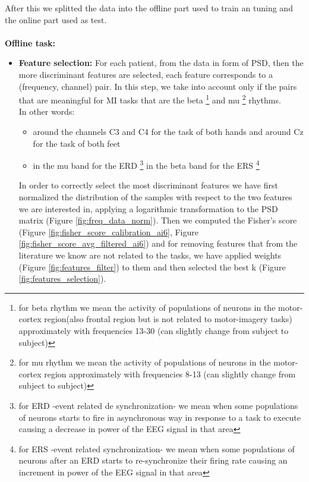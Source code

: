 After this we splitted the data into the offline part used to train an tuning and the online part used as test.\\ \\
{\Large \textbf{Offline task:}}
\begin{itemize}
\item \textbf{Feature selection:}  For each patient, from the data in form of PSD, then the more discriminant features are selected, each feature corresponds to a (frequency, channel) pair. In this step, we take into account only if the pairs that are meaningful for MI tasks that are the beta
\footnote{for beta rhythm we mean the activity of populations of neurons in the motor-cortex region(also frontal region but is not related to motor-imagery tasks) approximately with frequencies 13-30 (can slightly change from subject to subject)}
 and mu
 \footnote{for mu rhythm we mean the activity of populations of neurons in the motor-cortex region approximately with frequencies 8-13 (can slightly change from subject to subject)}
rhythms.\\
In other words:
\begin{itemize}
\item around the channels C3 and C4 for the task of both hands and around Cz for the task of both feet
\item  in the mu band for the ERD
 \footnote{for ERD -event related de synchronization- we mean when some populations of neurons starts to fire in asynchronous way in response to a task to execute causing a decrease in power of the EEG signal in that area}
 in the beta band for the ERS 
 \footnote{for ERS -event related synchronization- we mean when some populations of neurons after an ERD starts to re-synchronize their firing rate causing an increment in power of the EEG signal in that area}
\end{itemize}
In order to correctly select the most discriminant features we have first normalized the distribution of the samples with respect to the two features we are interested in, applying a logarithmic transformation to the PSD matrix (Figure \ref{fig:freq_data_norm}).
Then we computed the Fisher's score (Figure \ref{fig:fisher_score_calibration_ai6}, Figure \ref{fig:fisher_score_avg_filtered_ai6}) and for removing features that from the literature we know are not related to the tasks, we have applied weights (Figure \ref{fig:features_filter}) to them and then selected the best k (Figure \ref{fig:features_selection}).


\end{itemize}
